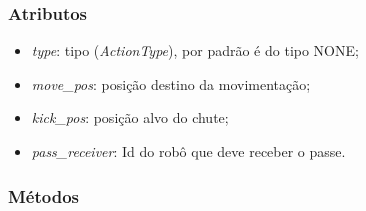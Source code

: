 \subsubsection*{Atributos}

\begin{itemize}
  \item \textit{type}: tipo (\textit{ActionType}), por padrão é do tipo NONE;
  \item \textit{move_pos}: posição destino da movimentação;
  \item \textit{kick_pos}: posição alvo do chute;
  \item \textit{pass_receiver}: Id do robô que deve receber o passe.
\end{itemize}

\subsubsection*{Métodos}

